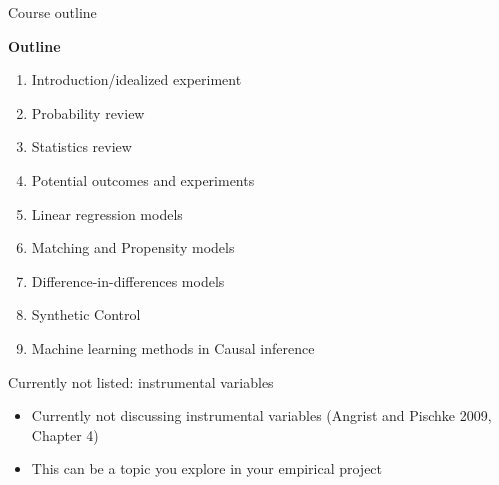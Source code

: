 \documentclass[compress, 8pt]{beamer}
\begin{document}
\begin{frame}{Course outline}

\textbf{Outline}
\begin{enumerate}
\item Introduction/idealized experiment


\item Probability review
\item Statistics review

%
\item Potential outcomes and experiments


\item Linear regression models 

\item Matching and Propensity models

\item Difference-in-differences models

\item Synthetic Control

\item Machine learning methods in Causal inference

\end{enumerate}

\vspace{2ex}
Currently not listed: instrumental variables
\begin{itemize}
    \item Currently not discussing instrumental variables (Angrist and Pischke 2009, Chapter 4)
    \item This can be a topic you explore in your empirical project
\end{itemize}

\end{frame}
\end{document}
